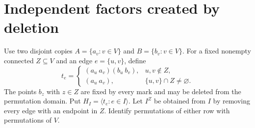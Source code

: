 \documentclass[a4paper,11pt]{article}
\newcommand{\gen}[1]{\langle #1\rangle}
\begin{document}
\section{Independent factors created by deletion}
Use two disjoint copies $A=\{a_v:v\in V\}$ and
$B=\{b_v:v\in V\}$. For a fixed nonempty connected $Z\subseteq V$ and
an edge $e=\{u,v\}$, define
\[
 t_e=\begin{cases}
 (a_u\ a_v)(b_u\ b_v),&u,v\notin Z,\\
 (a_u\ a_v),&\{u,v\}\cap Z\ne\varnothing.
 \end{cases}
\]
The points $b_z$ with $z\in Z$ are fixed by every mark and may be deleted
from the permutation domain. Put $H_I=\gen{t_e:e\in I}$.
Let $I^Z$ be obtained from $I$ by removing every edge with an endpoint in $Z$.
Identify permutations of either row with permutations of $V$.
\end{document}
